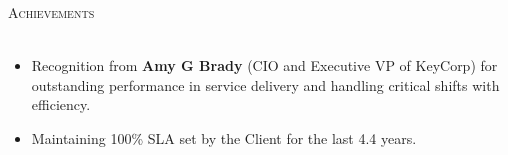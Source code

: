 \documentclass[a4paper]{article}
\newcommand{\lineunder} {
    \vspace*{-8pt} \\
    \hspace*{-18pt} \hrulefill \\
}
\newcommand{\header} [1] {
    {\hspace*{-18pt}\vspace*{6pt} \textsc{#1}}
    \vspace*{-6pt} \lineunder
}
\begin{document}
{\color{blue}\header{Achievements}}
\vspace{1mm}
\justify
\begin{itemize} \itemsep 1pt
           \item Recognition from \textbf{Amy G Brady} (CIO and Executive VP of KeyCorp) for outstanding performance in service delivery and handling critical shifts with efficiency. \\
           \item Maintaining 100\%  SLA set by the Client for the last 4.4 years.
\end{itemize}
\vspace{2mm}
\end{document}
